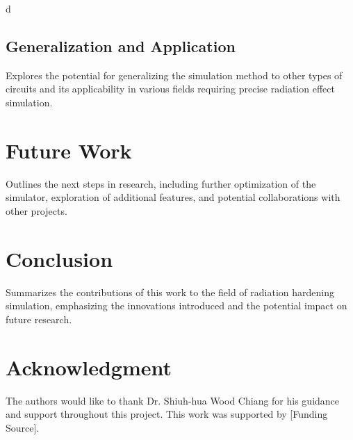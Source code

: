 d\documentclass[conference]{IEEEtran}
\begin{document}
\subsection{Generalization and Application}
Explores the potential for generalizing the simulation method to other types of circuits and its applicability in various fields requiring precise radiation effect simulation.

\section{Future Work}
Outlines the next steps in research, including further optimization of the simulator, exploration of additional features, and potential collaborations with other projects.

\section{Conclusion}
Summarizes the contributions of this work to the field of radiation hardening simulation, emphasizing the innovations introduced and the potential impact on future research.

\section*{Acknowledgment}
The authors would like to thank Dr. Shiuh-hua Wood Chiang for his guidance and support throughout this project. This work was supported by [Funding Source].



\end{document}
